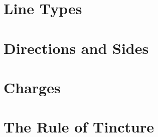 



\section{Line Types}

\section{Directions and Sides}

\section{Charges}

\section{The Rule of Tincture}
